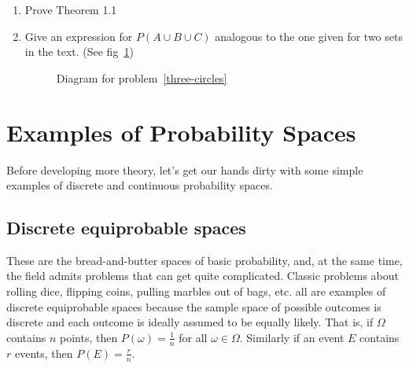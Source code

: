 \documentclass[../main.tex]{subfiles}
\begin{document}
{\begin{enumerate}
	\item Prove Theorem 1.1
	
	\item \label{three-circles} Give an expression for $P(A \cup B \cup C)$ analogous
	to the one given for two sets in the text. (See fig~\ref{fig:three-circles})
	
	\begin{figure}
		\begin{center}
			\def\firstcircle{(0,0) circle (1.5cm)}
			\def\secondcircle{(60:2cm) circle (1.5cm)}
			\def\thirdcircle{(0:2cm) circle (1.5cm)}
		\end{center}
		\caption{Diagram for problem~\ref{three-circles}}
		\label{fig:three-circles}
	\end{figure}
	
\end{enumerate}
}

\section{Examples of Probability Spaces}
Before developing more theory, let's get our hands dirty with some simple examples of discrete and continuous probability spaces.

\subsection{Discrete equiprobable spaces}
These are the bread-and-butter spaces of basic probability, and, at the same time, the field admits problems that
can get quite complicated. Classic problems about rolling dice, flipping coins, pulling marbles out of bags, etc. all are examples
of discrete equiprobable spaces because the sample space of
possible outcomes is discrete and each outcome is ideally 
assumed to be equally likely. That is, if $\Omega$ contains
$n$ points, then $P(\omega) = \frac1n$ for all $\omega \in \Omega$.
Similarly if an event $E$ contains $r$ events, then $P(E) = \frac{r}{n}$.
\end{document}

